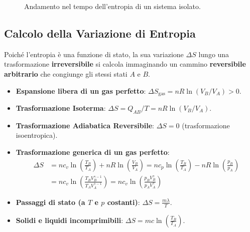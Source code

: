 \begin{figure}[ht]
\centering
{}
\caption{Andamento nel tempo dell'entropia di un sistema isolato.}
\end{figure}

\subsection{Calcolo della Variazione di Entropia}
Poiché l'entropia è una funzione di stato, la sua variazione $\Delta S$ lungo una trasformazione \textbf{irreversibile} si calcola immaginando un cammino \textbf{reversibile arbitrario} che congiunge gli stessi stati $A$ e $B$.
\begin{itemize}
    \item \textbf{Espansione libera di un gas perfetto}: $\Delta S_{\text{gas}} = n R \ln(V_B/V_A) > 0$.
    \item \textbf{Trasformazione Isoterma}: $\Delta S = Q_{AB}/T = n R \ln(V_B/V_A)$.
    \item \textbf{Trasformazione Adiabatica Reversibile}: $\Delta S = 0$ (trasformazione isoentropica).
    \item \textbf{Trasformazione generica di un gas perfetto}: 
    \begin{align}
        \Delta S &= n c_v \ln\left(\frac{T_B}{T_A}\right) + n R \ln\left(\frac{V_B}{V_A}\right) = n c_p \ln\left(\frac{T_B}{T_A}\right) - n R \ln\left(\frac{p_B}{p_A}\right) \\
        &= n c_v \ln\left( \frac{T_B V_B^{\gamma-1}}{T_A V_A^{\gamma-1}} \right) = n c_v \ln\left( \frac{p_B V_B^\gamma}{p_A V_A^\gamma} \right)
    \end{align}
    \item \textbf{Passaggi di stato (a $T$ e $p$ costanti)}: $\Delta S = \frac{m \lambda}{T}$.
    \item \textbf{Solidi e liquidi incomprimibili}: $\Delta S = m c \ln\left(\frac{T_B}{T_A}\right)$.
\end{itemize}


